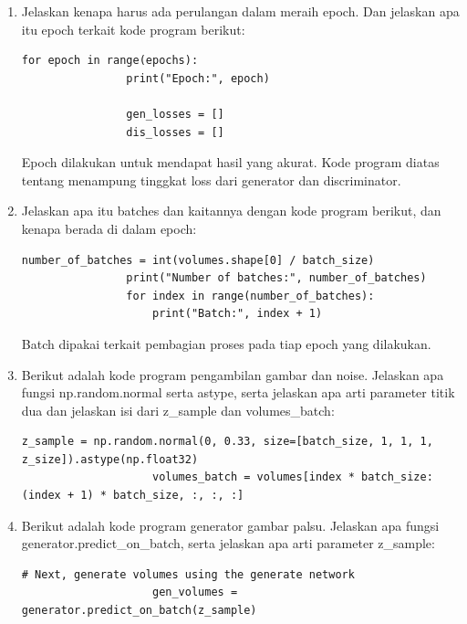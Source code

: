 \begin{enumerate}
    \item Jelaskan kenapa harus ada perulangan dalam meraih epoch. Dan jelaskan apa itu epoch terkait kode program berikut:
    \begin{lstlisting}[caption=Setting Epoch,label={lst:8.7}]
            for epoch in range(epochs):
                print("Epoch:", epoch)

                gen_losses = []
                dis_losses = []
    \end{lstlisting}
    Epoch dilakukan untuk mendapat hasil yang akurat. Kode program diatas tentang menampung tinggkat loss dari generator dan discriminator.
    
    \item Jelaskan apa itu batches dan kaitannya dengan kode program berikut, dan kenapa berada di dalam epoch:
    \begin{lstlisting}[caption=Setting Batch,label={lst:8.8}]
                number_of_batches = int(volumes.shape[0] / batch_size)
                print("Number of batches:", number_of_batches)
                for index in range(number_of_batches):
                    print("Batch:", index + 1)
    \end{lstlisting}
    Batch dipakai terkait pembagian proses pada tiap epoch yang dilakukan.
    
    \item Berikut adalah kode program pengambilan gambar dan noise. Jelaskan apa fungsi np.random.normal serta astype, serta jelaskan apa arti parameter titik dua dan jelaskan isi dari z\_sample dan volumes\_batch:
    \begin{lstlisting}[caption=Set real images dan vektor noise,label={lst:8.9}]
                    z_sample = np.random.normal(0, 0.33, size=[batch_size, 1, 1, 1, z_size]).astype(np.float32)
                    volumes_batch = volumes[index * batch_size:(index + 1) * batch_size, :, :, :]
    \end{lstlisting}

    \item Berikut adalah kode program generator gambar palsu. Jelaskan apa fungsi generator.predict\_on\_batch, serta jelaskan apa arti parameter z\_sample:
    \begin{lstlisting}[caption=Generator Gambar Palsu,label={lst:8.10}]
                    # Next, generate volumes using the generate network
                    gen_volumes = generator.predict_on_batch(z_sample)
    \end{lstlisting}


\end{enumerate}
